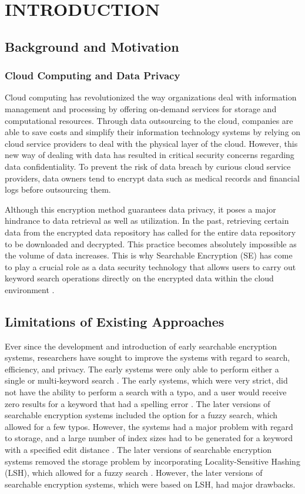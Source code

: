 \chapter{INTRODUCTION}
\graphicspath{{Chapter1/}}

\section{Background and Motivation}
\subsection{Cloud Computing and Data Privacy}
Cloud computing has revolutionized the way organizations deal with information management and processing by offering on-demand services for storage and computational resources. Through data outsourcing to the cloud, companies are able to save costs and simplify their information technology systems by relying on cloud service providers to deal with the physical layer of the cloud. However, this new way of dealing with data has resulted in critical security concerns regarding data confidentiality. To prevent the risk of data breach by curious cloud service providers, data owners tend to encrypt data such as medical records and financial logs before outsourcing them.

Although this encryption method guarantees data privacy, it poses a major hindrance to data retrieval as well as utilization. In the past, retrieving certain data from the encrypted data repository has called for the entire data repository to be downloaded and decrypted. This practice becomes absolutely impossible as the volume of data increases. This is why Searchable Encryption (SE) has come to play a crucial role as a data security technology that allows users to carry out keyword search operations directly on the encrypted data within the cloud environment \cite{song2000practical}.%

\section{Limitations of Existing Approaches}
Ever since the development and introduction of early searchable encryption systems, researchers have sought to improve the systems with regard to search, efficiency, and privacy. The early systems were only able to perform either a single or multi-keyword search \cite{song2000practical}. The early systems, which were very strict, did not have the ability to perform a search with a typo, and a user would receive zero results for a keyword that had a spelling error \cite{song2000practical}. The later versions of searchable encryption systems included the option for a fuzzy search, which allowed for a few typos. However, the systems had a major problem with regard to storage, and a large number of index sizes had to be generated for a keyword with a specified edit distance \cite{li2010fuzzy}. The later versions of searchable encryption systems removed the storage problem by incorporating Locality-Sensitive Hashing (LSH), which allowed for a fuzzy search \cite{wang2014privacy}. However, the later versions of searchable encryption systems, which were based on LSH, had major drawbacks.

